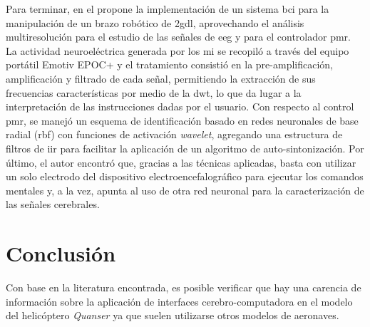     Para terminar, en el \citeyear{GarciaBlancas2016} \citet{GarciaBlancas2016} propone la implementación de un sistema \acrshort{bci} para la manipulación de un brazo robótico de \acrlong{2gdl}, aprovechando el análisis multiresolución para el estudio de las señales de \acrshort{eeg} y para el controlador \acrlong{pmr}. La actividad neuroeléctrica generada por los \acrlong{mi} se recopiló a través del equipo portátil Emotiv EPOC+ y el tratamiento consistió en la pre-amplificación, amplificación y filtrado de cada señal, permitiendo la extracción de sus frecuencias características por medio de la \acrfull{dwt}, lo que da lugar a la interpretación de las instrucciones dadas por el usuario. Con respecto al control \acrshort{pmr}, se manejó un esquema de identificación basado en redes neuronales de base radial (\acrshort{rbf}) con funciones de activación \textit{wavelet}, agregando una estructura de filtros de \acrfull{iir} para facilitar la aplicación de un algoritmo de auto-sintonización. Por último, el autor encontró que, gracias a las técnicas aplicadas, basta con utilizar un solo electrodo del dispositivo electroencefalográfico para ejecutar los comandos mentales y, a la vez, apunta al uso de otra red neuronal para la caracterización de las señales cerebrales.
    
    
\section{Conclusión}\label{sec:art comments}
    
    Con base en la literatura encontrada, es posible verificar que hay una carencia de información sobre la aplicación de interfaces cerebro-computadora en el modelo del helicóptero \textit{Quanser} ya que suelen utilizarse otros modelos de aeronaves.
    
